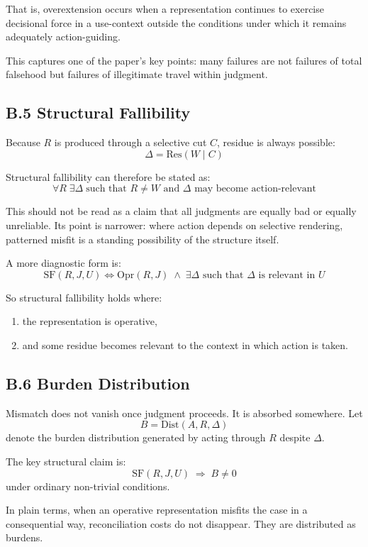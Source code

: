 \documentclass[11pt]{article}
\begin{document}
That is, overextension occurs when a representation continues to exercise decisional force in a use-context outside the conditions under which it remains adequately action-guiding.

This captures one of the paper's key points: many failures are not failures of total falsehood but failures of illegitimate travel within judgment.

\subsection*{B.5 Structural Fallibility}

Because \(R\) is produced through a selective cut \(C\), residue is always possible:
\[
\Delta = \mathrm{Res}(W \mid C)
\]

Structural fallibility can therefore be stated as:
\[
\forall R \; \exists \Delta \; \text{such that } R \neq W \text{ and } \Delta \text{ may become action-relevant}
\]

This should not be read as a claim that all judgments are equally bad or equally unreliable. Its point is narrower: where action depends on selective rendering, patterned misfit is a standing possibility of the structure itself.

A more diagnostic form is:
\[
\mathrm{SF}(R,J,U) \iff \mathrm{Opr}(R,J) \;\wedge\; \exists \Delta \text{ such that } \Delta \text{ is relevant in } U
\]

So structural fallibility holds where:
\begin{enumerate}
    \item the representation is operative,
    \item and some residue becomes relevant to the context in which action is taken.
\end{enumerate}

\subsection*{B.6 Burden Distribution}

Mismatch does not vanish once judgment proceeds. It is absorbed somewhere. Let
\[
B = \mathrm{Dist}(A,R,\Delta)
\]
denote the burden distribution generated by acting through \(R\) despite \(\Delta\).

The key structural claim is:
\[
\mathrm{SF}(R,J,U) \;\Rightarrow\; B \neq 0
\]
under ordinary non-trivial conditions.

In plain terms, when an operative representation misfits the case in a consequential way, reconciliation costs do not disappear. They are distributed as burdens.
\end{document}
